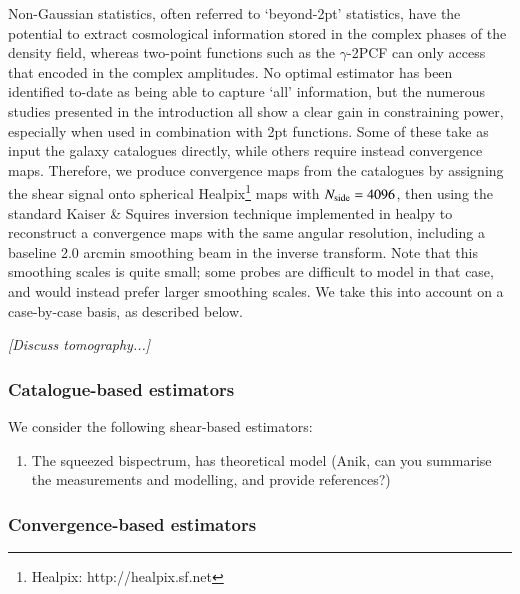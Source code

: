 \documentclass[useAMS,usenatbib]{mn2e}
\begin{document}
Non-Gaussian statistics, often referred to `beyond-2pt' statistics, have the potential to extract cosmological information stored in the complex phases of the density field, whereas two-point functions such as the $\gamma$-2PCF can only access that encoded in the complex amplitudes. No optimal estimator has been identified to-date as being able to capture `all' information, but the numerous studies presented in the introduction all show a clear gain in constraining power, especially when used in combination with 2pt functions. Some of these take as input the galaxy catalogues directly, while others require instead convergence maps. Therefore, we produce convergence maps from the catalogues by assigning the shear signal onto spherical {\sc Healpix}\footnote{{\sc Healpix}: http://healpix.sf.net}  maps \citep{healpix} with $N_{\rm side}=4096$, then using the standard Kaiser \& Squires inversion technique \citep{KaiserSquires} implemented in {\sc healpy} to reconstruct a convergence maps with the same angular resolution, including a baseline 2.0 arcmin smoothing beam in the inverse transform. Note that this smoothing scales is quite small; some probes are difficult to model in that case, and would instead prefer larger smoothing scales. We take this into account on a case-by-case basis, as described below. 
 
  {\it [Discuss tomography...]}
 
\subsubsection{Catalogue-based estimators}

We consider the following shear-based estimators:
\begin{enumerate}
\item The squeezed bispectrum, has theoretical model (Anik, can you summarise the measurements and modelling, and provide references?)
\end{enumerate}

\subsubsection{Convergence-based estimators}
\end{document}
